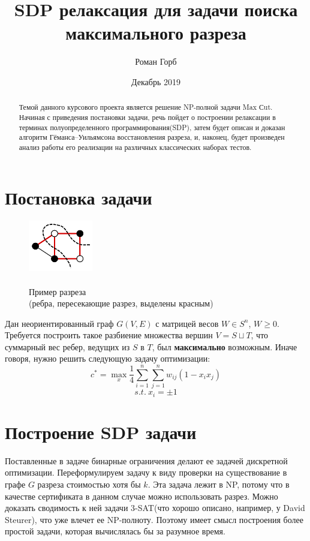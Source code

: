 \documentclass[12pt, a4paper]{article}
\title{SDP релаксация для задачи поиска максимального разреза}
\author{Роман Горб}
\date{Декабрь 2019}
\begin{document}
\maketitle

\begin{abstract}
Темой данного курсового проекта является решение NP-полной задачи Max Сut. Начиная с приведения постановки задачи, речь пойдет о построении релаксации в терминах полуопределенного программирования(SDP), затем будет описан и доказан алгоритм Гёманса–Уильямсона восстановления разреза, и, наконец, будет произведен анализ работы его реализации на различных классических наборах тестов.
\end{abstract}

\tableofcontents

\newpage

\section{Постановка задачи}

\begin{figure}
    \centering
    \includegraphics[width=0.25\textwidth]{images/Max-cut.png}
    \caption{\\Пример разреза\\(ребра, пересекающие разрез, выделены красным)}
    \label{fig:fig1}
\end{figure}

Дан неориентированный граф $G(V, E)$ с матрицей весов $W \in S^n$, $W \geqslant 0$. Требуется построить такое разбиение множества вершин $V=S\sqcup T$, что суммарный вес ребер, ведущих из $S$ в $T$, был \textbf{максимально} возможным. Иначе говоря, нужно решить следующую задачу оптимизации:
$$c^* = \max \limits_{x} \frac{1}{4} \sum_{i = 1}^{n} \sum_{j = 1}^{n} w_{ij}(1 - x_i x_j)$$
$$s.t.\: x_i =\pm1$$

\section{Построение SDP задачи}
Поставленные в задаче бинарные ограничения делают ее задачей дискретной оптимизации. Переформулируем задачу к виду проверки на существование в графе $G$ разреза стоимостью хотя бы $k$. Эта задача лежит в NP, потому что в качестве сертификата в данном случае можно использовать разрез. Можно доказать сводимость к ней задачи 3-SAT(что хорошо описано, например, у David Steurer\cite{reduction}), что уже влечет ее NP-полноту. Поэтому имеет смысл построения более простой задачи, которая вычислялась бы за разумное время.
\end{document}
